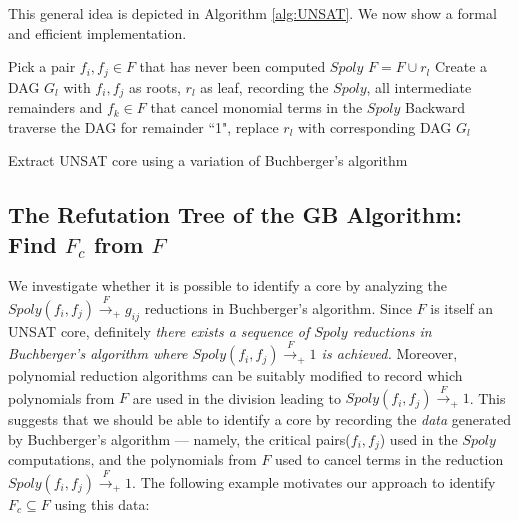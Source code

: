 This general idea is depicted in Algorithm \ref{alg:UNSAT}. 
We now show a formal and efficient implementation.

\begin{algorithm}[hbt]
\SetAlgoNoLine
\LinesNumbered
{
	Pick a pair $f_i,f_j\in F$ that has never been computed $Spoly$\;
	{
		$F = F\cup r_l$\;
		Create a DAG $G_l$ with $f_i,f_j$ as roots, $r_l$ as leaf, recording the $Spoly$, all intermediate remainders and $f_k\in F$ that cancel monomial terms in the $Spoly$\;
	}
}
Backward traverse the DAG for remainder ``1", replace $r_l$ with corresponding DAG $G_l$\;
\caption {Extract UNSAT core using a variation of Buchberger's algorithm}\label{alg:UNSAT}
\end{algorithm}

\subsection{The Refutation Tree of the GB Algorithm: Find $F_c$ from $F$}

We investigate whether it is possible to identify a core by analyzing the
$Spoly(f_i,f_j)\xrightarrow{F}_+ g_{ij}$ reductions in Buchberger's
algorithm. Since $F$ is itself an UNSAT core, 
definitely {\it there exists  
a sequence of $Spoly$ reductions in Buchberger's algorithm where
$Spoly(f_i, f_j) \xrightarrow{F}_+ 1$ is achieved.} Moreover, 
polynomial reduction algorithms can be suitably modified to record
which polynomials from $F$ are used in the division leading to
$Spoly(f_i,f_j)\xrightarrow{F}_+1$. This suggests that 
we should be able to identify a core by recording
the {\it data} generated by Buchberger's algorithm --- namely, the
critical pairs($f_i,f_j$) used in the $Spoly$ computations,
and the polynomials from $F$ used to cancel terms in the reduction
$Spoly(f_i,f_j)\xrightarrow{F}_+1$. The following example motivates
our approach to identify  $F_c \subseteq F$ using this data:

